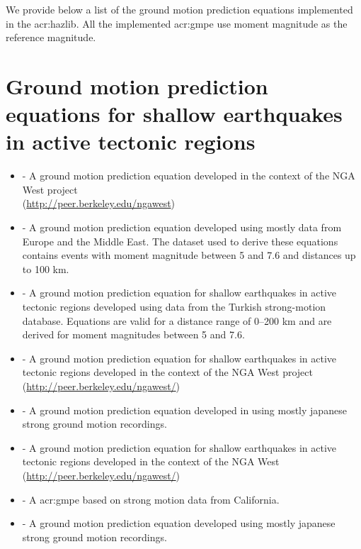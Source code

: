 \label{sec:gmpes_list}
We provide below a list of the ground motion prediction equations 
implemented in the \gls{acr:hazlib}. All the implemented \gls{acr:gmpe}
use moment magnitude as the reference magnitude.
%
\section{Ground motion prediction equations for shallow earthquakes 
    in active tectonic regions}
\begin{itemize} 
    \item \cite{abrahamson2008} - A ground motion prediction equation 
        developed in the context of the NGA West project \hfill \\
        (\href{http://peer.berkeley.edu/ngawest/}{http://peer.berkeley.edu/ngawest})
    \item \cite{akkar2010} - A ground motion prediction equation 
        developed using mostly data from Europe and the Middle East. The dataset 
        used to derive these equations contains events with moment 
        magnitude between 5 and 7.6 and distances up to 100 km.
    \item \cite{akkar2010a} - A ground motion prediction equation for shallow
        earthquakes in active tectonic regions developed using data from the 
        Turkish strong-motion database. Equations are valid for a distance 
        range of 0–200 km and are derived for moment magnitudes 
        between 5 and 7.6.
    \item \cite{boore2008} - A ground motion prediction equation 
        for shallow earthquakes in active tectonic regions developed in 
        the context of the NGA West project \hfill \\
        (\href{http://peer.berkeley.edu/ngawest/}
        {http://peer.berkeley.edu/ngawest/})
    \item \cite{cauzzi2008} - A ground motion prediction equation 
        developed in using mostly japanese strong ground motion recordings.
    \item \cite{chiou2008} - A ground motion prediction equation 
        for shallow earthquakes in active tectonic regions developed in 
        the context of the NGA West \hfill \\
        (\href{http://peer.berkeley.edu/ngawest/}
        {http://peer.berkeley.edu/ngawest/})
    \item \cite{sadigh1997} - A \gls{acr:gmpe} based on strong motion data 
        from California. 
    \item \cite{zhao2006} - A ground motion prediction equation 
        developed using mostly japanese strong ground motion 
        recordings. 
\end{itemize}
%
